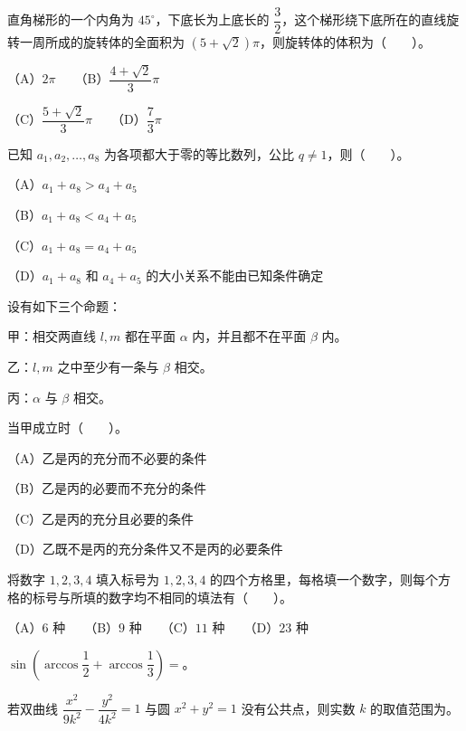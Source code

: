 \begin{question}
直角梯形的一个内角为 $45^\circ$，下底长为上底长的 $\dfrac32$，这个梯形绕下底所在的直线旋转一周所成的旋转体的全面积为 $(5+\sqrt2)\pi$，则旋转体的体积为\mbox{（　　）}。

（A）$2\pi$　　（B）$\dfrac{4+\sqrt2}{3}\pi$

（C）$\dfrac{5+\sqrt2}{3}\pi$　　（D）$\dfrac73\pi$

\end{question}
\begin{question}
已知 $a_1,a_2,\ldots,a_8$ 为各项都大于零的等比数列，公比 $q\ne1$，则\mbox{（　　）}。

（A）$a_1+a_8>a_4+a_5$

（B）$a_1+a_8<a_4+a_5$

（C）$a_1+a_8=a_4+a_5$

（D）$a_1+a_8$ 和 $a_4+a_5$ 的大小关系不能由已知条件确定

\end{question}
\begin{question}
设有如下三个命题：

甲：相交两直线 $l,m$ 都在平面 $\alpha$ 内，并且都不在平面 $\beta$ 内。

乙：$l,m$ 之中至少有一条与 $\beta$ 相交。

丙：$\alpha$ 与 $\beta$ 相交。

当甲成立时\mbox{（　　）}。

（A）乙是丙的充分而不必要的条件

（B）乙是丙的必要而不充分的条件

（C）乙是丙的充分且必要的条件

（D）乙既不是丙的充分条件又不是丙的必要条件

\end{question}
\begin{question}
将数字 $1,2,3,4$ 填入标号为 $1,2,3,4$ 的四个方格里，每格填一个数字，则每个方格的标号与所填的数字均不相同的填法有\mbox{（　　）}。

（A）$6$ 种　　（B）$9$ 种　　（C）$11$ 种　　（D）$23$ 种

\end{question}
\begin{question}
$\displaystyle\sin\left(\arccos\dfrac12+\arccos\dfrac13\right)=$\underline{\qquad\qquad}。

\end{question}
\begin{question}
若双曲线 $\dfrac{x^2}{9k^2}-\dfrac{y^2}{4k^2}=1$ 与圆 $x^2+y^2=1$ 没有公共点，则实数 $k$ 的取值范围为\underline{\qquad\qquad}。

\end{question}

